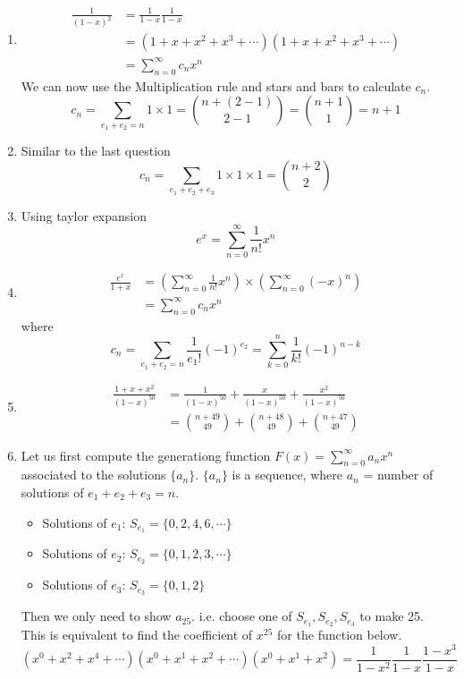 \begin{enumerate}
    \item \begin{equation}
        \begin{split}
            \frac{1}{(1-x)^2} &= \frac{1}{1-x}\frac{1}{1-x}\\
            &= (1+x+x^2+x^3+ \cdots)(1+x+x^2+x^3+ \cdots)\\
            &= \sum_{n=0}^{\infty}c_nx^n
        \end{split}
    \end{equation}
    We can now use the Multiplication rule and stars and bars to calculate $c_n$.
    $$c_n=\sum_{e_1+e_2=n}1 \times 1={n+(2-1) \choose 2-1}={n+1 \choose 1}=n+1$$
    \item Similar to the last question $$c_n = \sum_{e_1+e_2+e_3}1 \times 1 \times 1={n+2 \choose 2}$$
    \item Using taylor expansion $$e^x=\sum_{n=0}^{\infty}\frac{1}{n!}x^n$$
    \item \begin{equation}
        \begin{split}
            \frac{e^x}{1+x} &= (\sum_{n=0}^{\infty}\frac{1}{n!}x^n)\times (\sum_{n=0}^{\infty}(-x)^n)\\
            &= \sum_{n=0}^{\infty}c_nx^n
        \end{split}
    \end{equation}
    where $$c_n=\sum_{e_1+e_2=n}\frac{1}{e_1!}(-1)^{e_2}=\sum_{k=0}^n\frac{1}{k!}(-1)^{n-k}$$
    \item \begin{equation}
        \begin{split}
            \frac{1+x+x^2}{(1-x)^{50}} &= \frac{1}{(1-x)^{50}} + \frac{x}{(1-x)^{50}} + \frac{x^2}{(1-x)^{50}}\\
            &= {n+49 \choose 49} + {n+48 \choose 49} + {n+47 \choose 49}
        \end{split}
    \end{equation}
    \item Let us first compute the generationg function $F(x)=\sum_{n=0}^{\infty}a_nx^n$ associated to the solutions $\{a_n\}$. 
    $\{a_n\}$ is a sequence, where $a_n$ = number of solutions of $e_1+e_2+e_3=n$.
    \begin{itemize}
        \item Solutions of $e_1$: $S_{e_1}=\{0,2,4,6, \cdots\}$
        \item Solutions of $e_2$: $S_{e_2}=\{0,1,2,3, \cdots\}$
        \item Solutions of $e_3$: $S_{e_3}=\{0,1,2\}$
    \end{itemize}
    Then we only need to show $a_{25}$. i.e. choose one of $S_{e_1},S_{e_2},S_{e_3}$ to make 25. 
    This is equivalent to find the coefficient of $x^{25}$ for the function below.
    $$(x^0+x^2+x^4+ \cdots)(x^0+x^1+x^2+\cdots)(x^0+x^1+x^2)=\frac{1}{1-x^2}\frac{1}{1-x}\frac{1-x^3}{1-x}$$
\end{enumerate}

